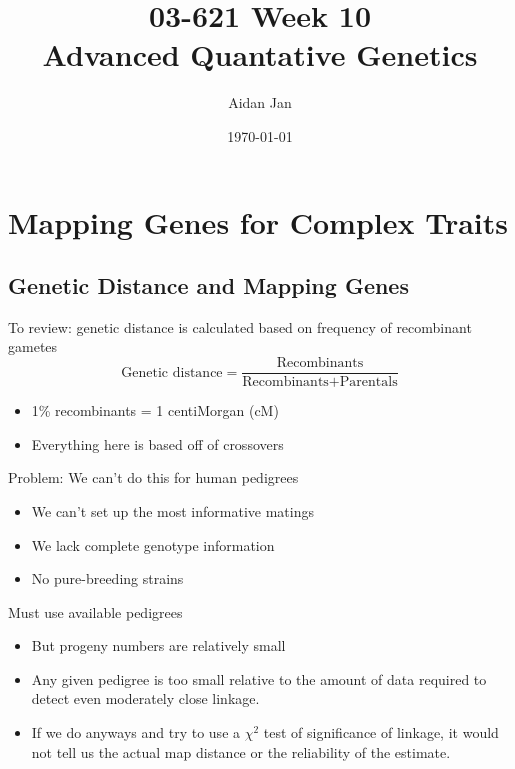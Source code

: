 \documentclass[10pt]{article}
\title{03-621 Week 10 \\ \large{Advanced Quantative Genetics}}
\author{Aidan Jan}
\date{\today}
\begin{document}
\maketitle

\section*{Mapping Genes for Complex Traits}
\subsection*{Genetic Distance and Mapping Genes}
To review: genetic distance is calculated based on frequency of recombinant gametes
\[\text{Genetic distance} = \frac{\text{Recombinants}}{\text{Recombinants} + \text{Parentals}}\]
\begin{itemize}
    \item 1\% recombinants = 1 centiMorgan (cM)
    \item Everything here is based off of crossovers
\end{itemize}
Problem: We can't do this for human pedigrees
\begin{itemize}
	\item We can't set up the most informative matings
	\item We lack complete genotype information
	\item No pure-breeding strains
\end{itemize}
Must use available pedigrees
\begin{itemize}
	\item But progeny numbers are relatively small
	\item Any given pedigree is too small relative to the amount of data required to detect even moderately close linkage.
	\item If we do anyways and try to use a $\chi^2$ test of significance of linkage, it would not tell us the actual map distance or the reliability of the estimate.
\end{itemize}
\end{document}
